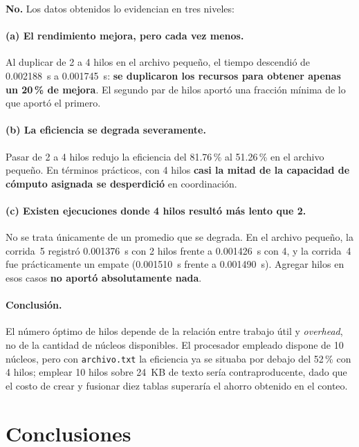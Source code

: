 \documentclass[11pt,letterpaper]{article}
\begin{document}
\textbf{No.} Los datos obtenidos lo evidencian en tres niveles:

\paragraph{(a) El rendimiento mejora, pero cada vez menos.}
Al duplicar de 2 a 4 hilos en el archivo pequeño, el tiempo descendió de
\num{0.002188}~s a \num{0.001745}~s: \textbf{se duplicaron los recursos para
obtener apenas un 20\,\% de mejora}. El segundo par de hilos aportó una fracción
mínima de lo que aportó el primero.

\paragraph{(b) La eficiencia se degrada severamente.}
Pasar de 2 a 4 hilos redujo la eficiencia del 81.76\,\% al 51.26\,\% en el archivo
pequeño. En términos prácticos, con 4 hilos \textbf{casi la mitad de la capacidad
de cómputo asignada se desperdició} en coordinación.

\paragraph{(c) Existen ejecuciones donde 4 hilos resultó más lento que 2.}
No se trata únicamente de un promedio que se degrada. En el archivo pequeño, la
corrida~5 registró \num{0.001376}~s con 2 hilos frente a \num{0.001426}~s con 4, y
la corrida~4 fue prácticamente un empate (\num{0.001510}~s frente a
\num{0.001490}~s). Agregar hilos en esos casos \textbf{no aportó absolutamente
nada}.

\paragraph{Conclusión.}
El número óptimo de hilos depende de la relación entre trabajo útil y
\emph{overhead}, no de la cantidad de núcleos disponibles. El procesador empleado
dispone de 10 núcleos, pero con \texttt{archivo.txt} la eficiencia ya se situaba
por debajo del 52\,\% con 4 hilos; emplear 10 hilos sobre 24~KB de texto sería
contraproducente, dado que el costo de crear y fusionar diez tablas superaría el
ahorro obtenido en el conteo.

\section{Conclusiones}
\end{document}
